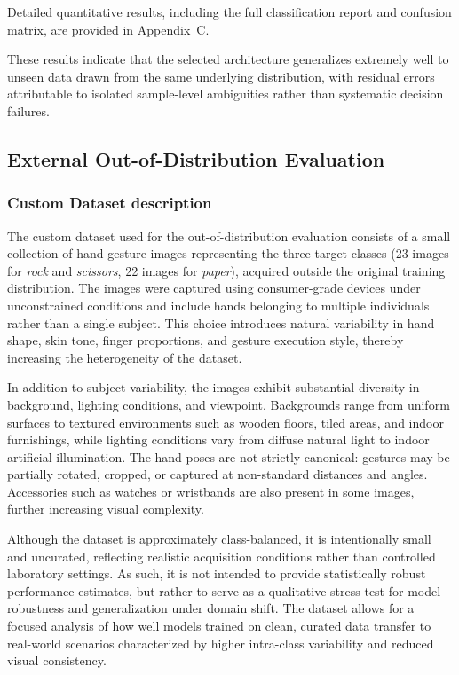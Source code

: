 \documentclass{article}
\begin{document}
Detailed quantitative results, including the full classification report 
and confusion matrix, are provided in Appendix~C.

These results indicate that the selected architecture generalizes 
extremely well to unseen data drawn from the same underlying 
distribution, with residual errors attributable to isolated sample-level 
ambiguities rather than systematic decision failures.

\subsection{External Out-of-Distribution Evaluation}
\subsubsection{Custom Dataset description}

The custom dataset used for the out-of-distribution evaluation consists
of a small collection of hand gesture images representing the three
target classes (23 images for \emph{rock} and \emph{scissors}, 22 images for \emph{paper}),
acquired outside the original training distribution. The images were
captured using consumer-grade devices under unconstrained conditions and
include hands belonging to multiple individuals rather than a single
subject. This choice introduces natural variability in hand shape, skin
tone, finger proportions, and gesture execution style, thereby
increasing the heterogeneity of the dataset.

In addition to subject variability, the images exhibit substantial
diversity in background, lighting conditions, and viewpoint. Backgrounds
range from uniform surfaces to textured environments such as wooden
floors, tiled areas, and indoor furnishings, while lighting conditions
vary from diffuse natural light to indoor artificial illumination. The
hand poses are not strictly canonical: gestures may be partially
rotated, cropped, or captured at non-standard distances and angles.
Accessories such as watches or wristbands are also present in some
images, further increasing visual complexity.

Although the dataset is approximately class-balanced, it is
intentionally small and uncurated, reflecting realistic acquisition
conditions rather than controlled laboratory settings. As such, it is
not intended to provide statistically robust performance estimates, but
rather to serve as a qualitative stress test for model robustness and
generalization under domain shift. The dataset allows for a focused
analysis of how well models trained on clean, curated data transfer to
real-world scenarios characterized by higher intra-class variability and
reduced visual consistency.
\end{document}
